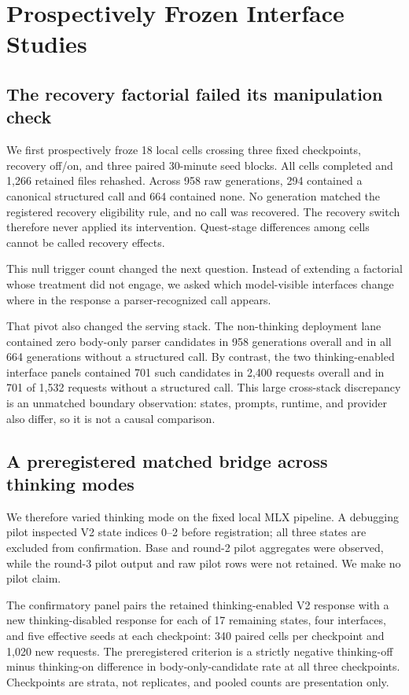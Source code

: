 \documentclass[10pt]{article}
\begin{document}
\section{Prospectively Frozen Interface Studies}

\subsection{The recovery factorial failed its manipulation check}

We first prospectively froze 18 local cells crossing three fixed checkpoints,
recovery off/on, and three paired 30-minute seed blocks. All cells completed and
1,266 retained files rehashed. Across 958 raw generations, 294 contained a
canonical structured call and 664 contained none. No generation matched the
registered recovery eligibility rule, and no call was recovered. The recovery
switch therefore never applied its intervention. Quest-stage differences among
cells cannot be called recovery effects.

This null trigger count changed the next question. Instead of extending a
factorial whose treatment did not engage, we asked which model-visible
interfaces change where in the response a parser-recognized call appears.

That pivot also changed the serving stack. The non-thinking deployment lane
contained zero body-only parser candidates in 958 generations overall and in
all 664 generations without a structured call. By contrast, the two
thinking-enabled interface panels contained 701 such candidates in 2,400
requests overall and in 701 of 1,532 requests without a structured call. This
large cross-stack discrepancy is an unmatched boundary observation: states,
prompts, runtime, and provider also differ, so it is not a causal comparison.

\subsection{A preregistered matched bridge across thinking modes}
\label{sec:thinking-parity}

We therefore varied thinking mode on the fixed local MLX pipeline. A debugging
pilot inspected V2 state indices 0--2 before registration; all three states are
excluded from confirmation. Base and round-2 pilot aggregates were observed,
while the round-3 pilot output and raw pilot rows were not retained. We make no
pilot claim.

The confirmatory panel pairs the retained thinking-enabled V2 response with a
new thinking-disabled response for each of 17 remaining states, four interfaces,
and five effective seeds at each checkpoint: 340 paired cells per checkpoint
and 1,020 new requests. The preregistered criterion is a strictly negative
thinking-off minus thinking-on difference in body-only-candidate rate at all
three checkpoints. Checkpoints are strata, not replicates, and pooled counts
are presentation only.
\end{document}
